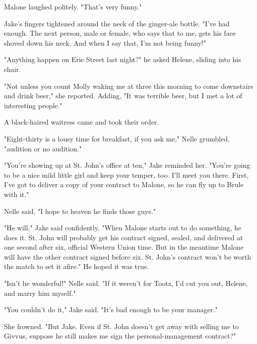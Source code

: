 \documentclass{novel}
\begin{document}
Malone laughed politely. "That's very funny."

Jake's fingers tightened around the neck of the ginger-ale bottle. "I've had enough. The next person, male or female, who says that to me, gets his face shoved down his neck. And when I say that, I'm not being funny!"

\begin{ChapterStart}
\vspace{3\nbs}
\end{ChapterStart}

"Anything happen on Erie Street last night?" he asked Helene, sliding into his chair.

"Not unless you count Molly waking me at three this morning to come downstairs and drink beer," she reported. Adding, "It was terrible beer, but I met a lot of interesting people."

A black-haired waitress came and took their order.

"Eight-thirty is a lousy time for breakfast, if you ask me," Nelle grumbled, "audition or no audition."

"You're showing up at St. John's office at ten," Jake reminded her. "You're going to be a nice mild little girl and keep your temper, too. I'll meet you there. First, I've got to deliver a copy of your contract to Malone, so he can fly up to Brule with it."

Nelle said, "I hope to heaven he finds those guys."

"He will," Jake said confidently. "When Malone starts out to do something, he does it. St. John will probably get his contract signed, sealed, and delivered at one second after six, official Western Union time. But in the meantime Malone will have the other contract signed before six. St. John's contract won't be worth the match to set it afire." He hoped it was true.

"Isn't he wonderful!" Nelle said. "If it weren't for Tootz, I'd cut you out, Helene, and marry him myself."

"You couldn't do it," Jake said. "It's bad enough to be your manager."

She frowned. "But Jake. Even if St. John doesn't get away with selling me to Givvus, suppose he still makes me sign the personal-management contract?"
\end{document}
